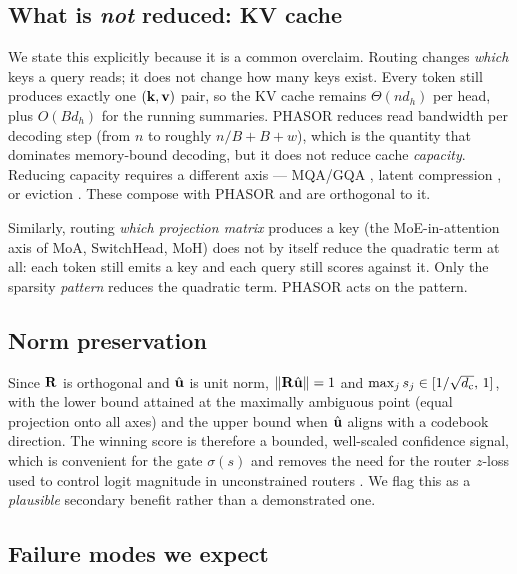 \subsection{What is \emph{not} reduced: KV cache}

We state this explicitly because it is a common overclaim. Routing changes \emph{which} keys a query reads; it does not change how many keys exist. Every token still produces exactly one $(\mathbf{k},\mathbf{v})$ pair, so the KV cache remains $\Theta(n d_h)$ per head, plus $O(B d_h)$ for the running summaries. PHASOR reduces read bandwidth per decoding step (from $n$ to roughly $n/B + B + w$), which is the quantity that dominates memory-bound decoding, but it does not reduce cache \emph{capacity}. Reducing capacity requires a different axis --- MQA/GQA \citep{shazeer2019fast,ainslie2023gqa}, latent compression \citep{deepseekv2}, or eviction \citep{zhang2023h2o}. These compose with PHASOR and are orthogonal to it.

Similarly, routing \emph{which projection matrix} produces a key (the MoE-in-attention axis of MoA, SwitchHead, MoH) does not by itself reduce the quadratic term at all: each token still emits a key and each query still scores against it. Only the sparsity \emph{pattern} reduces the quadratic term. PHASOR acts on the pattern.

\subsection{Norm preservation}

Since $\mathbf{R}$ is orthogonal and $\hat{\mathbf{u}}$ is unit norm, $\|\mathbf{R}\hat{\mathbf{u}}\| = 1$ and $\max_j s_j \in [1/\sqrt{d_{\mathrm{c}}},\, 1]$, with the lower bound attained at the maximally ambiguous point (equal projection onto all axes) and the upper bound when $\hat{\mathbf{u}}$ aligns with a codebook direction. The winning score is therefore a bounded, well-scaled confidence signal, which is convenient for the gate $\sigma(s)$ and removes the need for the router $z$-loss used to control logit magnitude in unconstrained routers \citep{zoph2022stmoe}. We flag this as a \emph{plausible} secondary benefit rather than a demonstrated one.

\subsection{Failure modes we expect}
\label{sec:limits}


